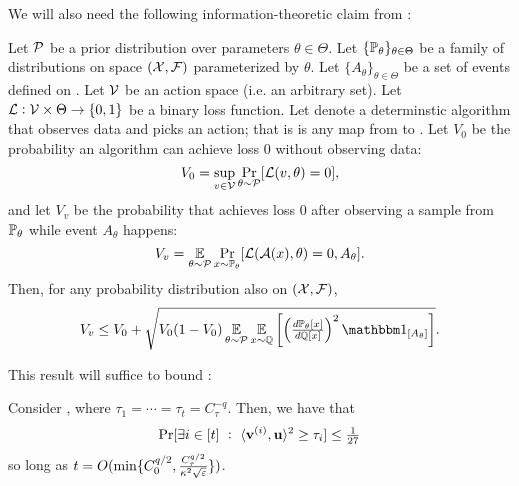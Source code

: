We will also need the following information-theoretic claim from \cite{simchowitz2017gap}:
\begin{importedtheorem}
    \label{impthm:simchowitz-core-chi-squared-divergence}
    Let \({\mathcal P}\) be a prior distribution over parameters \(\theta \in \Theta\).
    Let \(\{{\mathbb P}_\theta\}_{\theta \in \Theta}\) be a family of distributions on space \(({\mathcal X},{\mathcal F})\) parameterized by \(\theta\).
    Let \(\{A_{\theta}\}_{\theta \in \Theta}\) be a set of events defined on \cF.
    Let \({\mathcal V}\) be an action space (i.e. an arbitrary set).
    Let \({\mathcal L}:{\mathcal V}\times\Theta \rightarrow \{0,1\}\) be a binary loss function.
    Let \cA denote a determinstic algorithm that observes data and picks an action; that is \cA is any map from \cX to \cV.
    Let \(V_0\) be the probability an algorithm can achieve loss 0 without observing data:
    \[
        V_0 = \sup_{v\in{\mathcal V}} \Pr_{\theta \sim {\mathcal P}} [{\mathcal L}(v,\theta)=0],
    \]
    and let \(V_v\) be the probability that \cA achieves loss 0 after observing a sample from \({\mathbb P}_\theta\) while event \(A_{\theta}\) happens:
    \[
        V_v = \operatorname*{\mathbb{E}}_{\theta\sim{\mathcal P}} \Pr_{x\sim{\mathbb P}_\theta}[{\mathcal L}({\mathcal A}(x), \theta) = 0, A_\theta].
    \]
    Then, for any probability distribution \bbQ also on \(({\mathcal X},{\mathcal F})\),
    \[
        V_v \leq V_0 + \sqrt{V_0(1-V_0)\E_{\theta\sim\cP}\E_{x\sim\bbQ}\left[
            \left(\tsfrac{d\bbP_{\theta}[x]}{d\bbQ[x]}\right)^2
            \mathbbm1_{[A_\theta]}
        \right]}.
    \]
\end{importedtheorem}
This result will suffice to bound :
\begin{lemma}
    \label{lem:finding-u-lower-bound}
    Consider , where \(\tau_1=\cdots=\tau_t = C_\tau^{-q}\).
    Then, we have that
    \[
        \Pr[\exists i \in [t] ~:~ \langle \boldsymbol{\mathrm{v}}^{(i)}, \boldsymbol{\mathrm{u}}\rangle^2 \geq \tau_i] \leq {\textstyle\frac{1}{27}}
    \]
    so long as \(t = O(\min\{C_0^{q/2}, \frac{C_\tau^{q/2}}{\kappa^2 \sqrt{\varepsilon}}\})\).
\end{lemma}

